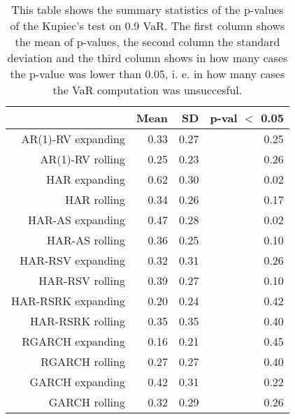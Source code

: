 \begin{table}[ht]
\centering
\begin{tabular}{rrrr}
  \hline
 & Mean & SD & p-val $<$ 0.05 \\ 
  \hline
AR(1)-RV expanding & 0.33 & 0.27 & 0.25 \\ 
  AR(1)-RV rolling & 0.25 & 0.23 & 0.26 \\ 
  HAR expanding & 0.62 & 0.30 & 0.02 \\ 
  HAR rolling & 0.34 & 0.26 & 0.17 \\ 
  HAR-AS expanding & 0.47 & 0.28 & 0.02 \\ 
  HAR-AS rolling & 0.36 & 0.25 & 0.10 \\ 
  HAR-RSV expanding & 0.32 & 0.31 & 0.26 \\ 
  HAR-RSV rolling & 0.39 & 0.27 & 0.10 \\ 
  HAR-RSRK expanding & 0.20 & 0.24 & 0.42 \\ 
  HAR-RSRK rolling & 0.35 & 0.35 & 0.40 \\ 
  RGARCH expanding & 0.16 & 0.21 & 0.45 \\ 
  RGARCH rolling & 0.27 & 0.27 & 0.40 \\ 
  GARCH expanding & 0.42 & 0.31 & 0.22 \\ 
  GARCH rolling & 0.32 & 0.29 & 0.26 \\ 
   \hline
\end{tabular}
\caption[Kupiec's test p-values summary, alpha =0.9]{This table shows the summary statistics of the p-values of the Kupiec's test on 0.9 VaR. 
            The first column shows the mean of p-values, the second column the standard deviation 
            and the third column shows in how many cases the p-value was lower than 0.05, i. e. in how many cases the VaR computation was unsuccesful.} 
\label{Table:Kupiec_test_summary_0.9}
\end{table}
